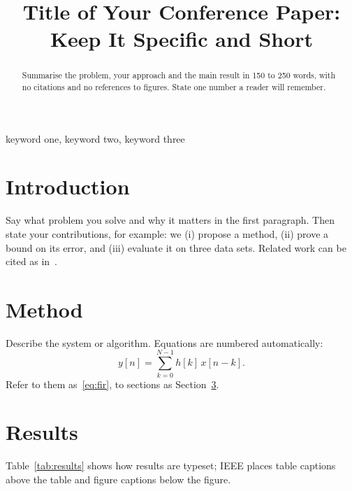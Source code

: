\documentclass[conference]{IEEEtran}
\begin{document}
\title{Title of Your Conference Paper:\\ Keep It Specific and Short}

\author{
\and
}

\maketitle

\begin{abstract}
Summarise the problem, your approach and the main result in 150 to 250 words, with
no citations and no references to figures. State one number a reader will remember.
\end{abstract}

\begin{IEEEkeywords}
keyword one, keyword two, keyword three
\end{IEEEkeywords}

\section{Introduction}
Say what problem you solve and why it matters in the first paragraph. Then state your
contributions, for example: we (i) propose a method, (ii) prove a bound on its error,
and (iii) evaluate it on three data sets. Related work can be cited as in~\cite{lamport94}.

\section{Method}
Describe the system or algorithm. Equations are numbered automatically:
\begin{equation}
  y[n] = \sum_{k=0}^{N-1} h[k]\, x[n-k] .
  \label{eq:fir}
\end{equation}
Refer to them as~\eqref{eq:fir}, to sections as Section~\ref{sec:results}.

\section{Results}\label{sec:results}
Table~\ref{tab:results} shows how results are typeset; IEEE places table captions
above the table and figure captions below the figure.
\end{document}
